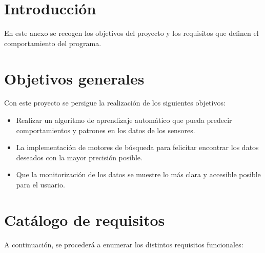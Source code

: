 
\section{Introducción}

En este anexo se recogen los objetivos del proyecto y los requisitos que definen el comportamiento del programa.

\section{Objetivos generales}

Con este proyecto se persigue la realización de los siguientes objetivos:

\begin{itemize}
    \item Realizar un algoritmo de aprendizaje automático que pueda predecir comportamientos y patrones en los datos de los sensores.
    \item La implementación de motores de búsqueda para felicitar encontrar los datos deseados con la mayor precisión posible.
    \item Que la monitorización de los datos se muestre lo más clara y accesible posible para el usuario.
\end{itemize}

\newpage
\section{Catálogo de requisitos}
A continuación, se procederá a enumerar los distintos requisitos funcionales:


